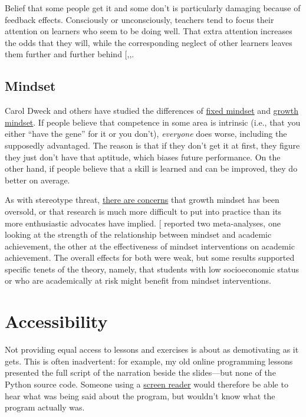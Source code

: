 Belief that some people get it and some don't is particularly damaging
because of feedback effects. Consciously or unconsciously, teachers tend
to focus their attention on learners who seem to be doing well. That
extra attention increases the odds that they will, while the
corresponding neglect of other learners leaves them further and further
behind {[},,\protect[\hyperlink{b:Juss2005}{Juss2005}]{]}.

\subsection{Mindset}\label{mindset}

Carol Dweck and others have studied the differences of
\protect\hyperlink{g:fixed-mindset}{fixed mindset} and
\protect\hyperlink{g:growth-mindset}{growth mindset}. If people believe that
competence in some area is intrinsic (i.e., that you either ``have the
gene'' for it or you don't), \emph{everyone} does worse, including the
supposedly advantaged. The reason is that if they don't get it at first,
they figure they just don't have that aptitude, which biases future
performance. On the other hand, if people believe that a skill is
learned and can be improved, they do better on average.

As with stereotype threat, \href{https://educhatter.wordpress.com/2017/03/26/growth-mindset-is-the-theory-flawed-or-has-gm-been-debased-in-the-classroom/}{there are concerns}
that growth mindset has been oversold, or that research is much more
difficult to put into practice than its more enthusiastic advocates
have implied. {[}\protect[\hyperlink{b:Sisk2018}{Sisk2018}]{]} reported two meta-analyses, one
looking at the strength of the relationship between mindset and
academic achievement, the other at the effectiveness of mindset
interventions on academic achievement. The overall effects for both
were weak, but some results supported specific tenets of the theory,
namely, that students with low socioeconomic status or who are
academically at risk might benefit from mindset interventions.

\section{Accessibility}\label{s:motivation-accessibility}

Not providing equal access to lessons and exercises is about as
demotivating as it gets. This is often inadvertent: for example, my
old online programming lessons presented the full script of the
narration beside the slides---but none of the Python source
code. Someone using a \href{https://en.wikipedia.org/wiki/Screen_reader}{screen reader} would therefore
be able to hear what was being said about the program, but wouldn't
know what the program actually was.

